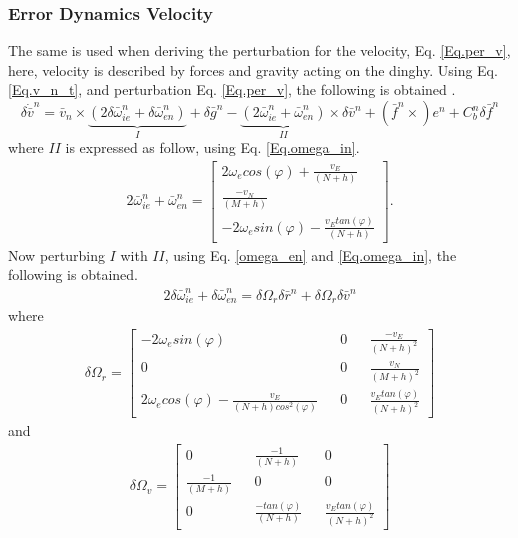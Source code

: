 \subsubsection{Error Dynamics Velocity}
The same is used when deriving the perturbation for the velocity, Eq. \eqref{Eq.per_v}, here, velocity is described by forces and gravity acting on the dinghy. Using Eq. \eqref{Eq.v_n_t}, and perturbation Eq. \eqref{Eq.per_v}, the following is obtained \cite{nonlinear}.
\begin{equation}
\delta \dot{\bar{v}}^n = \bar{v}_n \times \underbrace{(2\delta \bar{\omega}_{ie}^n+ \delta \bar{\omega}_{en}^n)}_{I}+\delta \bar{g}^n -\underbrace{(2\bar{\omega}_{ie}^n + \bar{\omega}_{en}^n)}_{II}\times \delta \bar{v}^n + (\bar{f}^n\times) e^n +C_b^n\delta \bar{f}^n
\label{Eq.delta_v}
\end{equation}
where $II$ is expressed as follow, using Eq. \eqref{Eq.omega_in}.
\begin{align}
2\bar{\omega}_{ie}^n + \bar{\omega}_{en}^n = 
\begin{bmatrix}
2\omega_e cos(\varphi) + \frac{v_E}{(N+h)} \\
\frac{-v_N}{(M+h)} \\
-2\omega_e sin(\varphi) - \frac{v_E tan(\varphi)}{(N+h)}
\end{bmatrix}.
\label{Eq.II}
\end{align}
Now perturbing $I$ with $II$, using Eq. \eqref{omega_en} and \eqref{Eq.omega_in}, the following is obtained.
\begin{align}
2\delta \bar{\omega}_{ie}^n+ \delta \bar{\omega}_{en}^n =
\delta \Omega_r\delta \bar{r}^n + \delta\Omega_r\delta\bar{v}^n
\end{align}
where
\begin{align}
\delta\Omega_r = 
\begin{bmatrix}
-2 \omega_e sin(\varphi) && 0 && \frac{-v_E}{(N+h)^2}\\
0 && 0 && \frac{v_N}{(M+h)^2}\\
2 \omega_e cos(\varphi)-\frac{v_E}{(N+h)cos^2(\varphi)} && 0 && \frac{v_E tan(\varphi)}{(N+h)^2}
\end{bmatrix}
\label{Eq.Omega_r}
\end{align}
and
\begin{align}
\delta\Omega_v = 
\begin{bmatrix}
0 &&  \frac{-1}{(N+h)} && 0\\
\frac{-1}{(M+h)} && 0 && 0\\
0 && \frac{-tan(\varphi)}{(N+h)} && \frac{v_E tan(\varphi)}{(N+h)^2}
\end{bmatrix}
\label{Eq.Omega_v}
\end{align}
